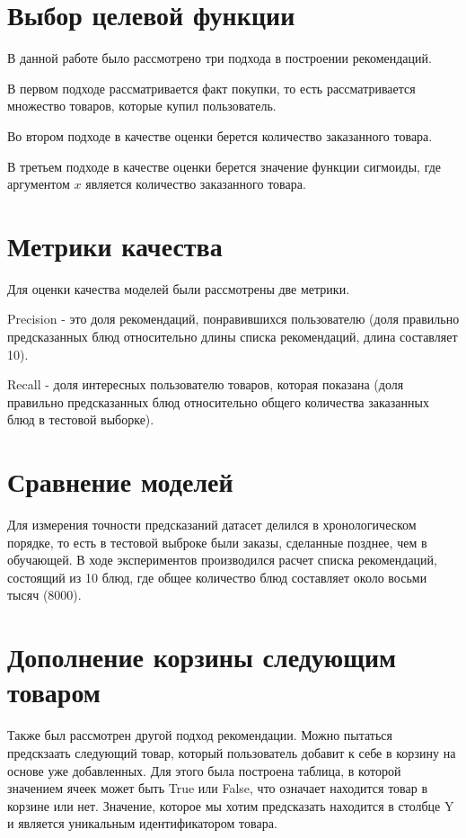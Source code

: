 \documentclass{fefu}
\begin{document}
  \section{Выбор целевой функции}
  В данной работе было рассмотрено три подхода в построении рекомендаций.

  В первом подходе рассматривается факт покупки, то есть рассматривается множество
  товаров, которые купил пользователь.

  Во втором подходе в качестве оценки берется количество заказанного товара.

  В третьем подходе в качестве оценки берется значение функции сигмоиды, где аргументом
  $x$ является количество заказанного товара.

  \section{Метрики качества}
  Для оценки качества моделей были рассмотрены две метрики.

  Precision - это доля рекомендаций, понравившихся пользователю (доля правильно
  предсказанных блюд относительно длины списка рекомендаций, длина составляет 10).

  Recall - доля интересных пользователю товаров, которая показана (доля правильно
  предсказанных блюд относительно общего количества заказанных блюд в тестовой
  выборке).

  \section{Сравнение моделей}
  Для измерения точности предсказаний датасет делился в хронологическом порядке,
  то есть в тестовой выброке были заказы, сделанные позднее, чем в обучающей.
  В ходе экспериментов производился расчет списка рекомендаций, состоящий из 10
  блюд, где общее количество блюд составляет около восьми тысяч (8000).

  \section{Дополнение корзины следующим товаром}
  Также был рассмотрен другой подход рекомендации. Можно пытаться предскзаать
  следующий товар, который пользователь добавит к себе в корзину на основе уже добавленных.
  Для этого была построена таблица, в которой значением ячеек может быть True или False, что означает
  находится товар в корзине или нет. Значение, которое мы хотим предсказать находится
  в столбце Y и является уникальным идентификатором товара.
\end{document}
